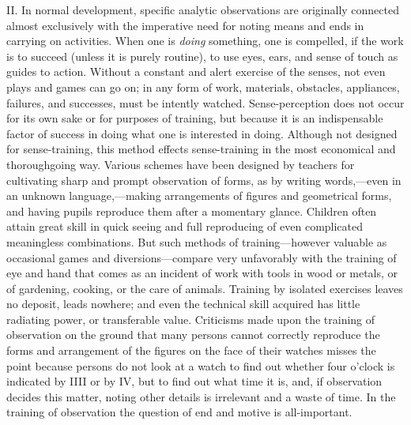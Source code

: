 \documentclass[letterpaper]{book}
\begin{document}
II. In normal development, specific analytic observations are originally
connected almost exclusively with the imperative need for noting means
and ends in carrying on activities. When one is \emph{doing} something,
one is compelled, if the work is to succeed (unless it is purely
routine), to use eyes, ears, and sense of touch as guides to action.
Without a constant and alert exercise of the senses, not even plays and
games can go on; in any form of work, materials, obstacles, appliances,
failures, and successes, must be intently watched. Sense-perception does
not occur for its own sake or for purposes of training, but because it
is an indispensable factor of success in doing what one is interested in
doing. Although not designed for sense-training, this method effects
sense-training in the most economical and thoroughgoing way. Various
schemes have been designed by teachers for cultivating sharp and prompt
observation of forms, as by writing words,---even in an unknown
language,---making arrangements of figures and geometrical forms, and
having pupils reproduce them after a momentary glance. Children often
attain great skill in quick seeing and full reproducing of even
complicated meaningless combinations. But such methods of
training---however
valuable as occasional games and diversions---compare very unfavorably
with the training of eye and hand that comes as an incident of work with
tools in wood or metals, or of gardening, cooking, or the care of
animals. Training by isolated exercises leaves no deposit, leads
nowhere; and even the technical skill acquired has little radiating
power, or transferable value. Criticisms made upon the training of
observation on the ground that many persons cannot correctly reproduce
the forms and arrangement of the figures on the face of their watches
misses the point because persons do not look at a watch to find out
whether four o'clock is indicated by IIII or by IV, but to find out what
time it is, and, if observation decides this matter, noting other
details is irrelevant and a waste of time. In the training of
observation the question of end and motive is all-important.


\end{document}
